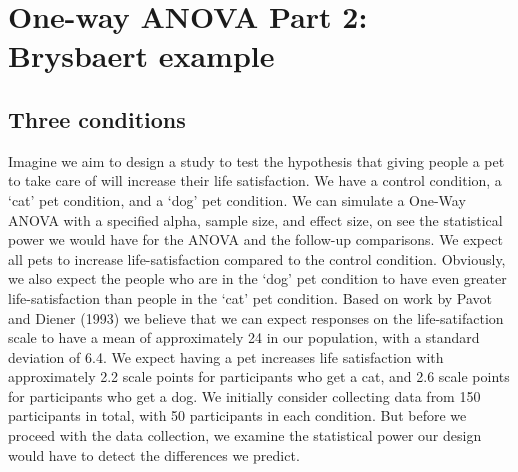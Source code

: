 \documentclass[]{book}
\begin{document}
\hypertarget{one-way-anova-part-2-brysbaert-example}{%
\section{One-way ANOVA Part 2: Brysbaert example}\label{one-way-anova-part-2-brysbaert-example}}

\hypertarget{three-conditions}{%
\subsection{Three conditions}\label{three-conditions}}

Imagine we aim to design a study to test the hypothesis that giving people a pet to take care of will increase their life satisfaction. We have a control condition, a `cat' pet condition, and a `dog' pet condition. We can simulate a One-Way ANOVA with a specified alpha, sample size, and effect size, on see the statistical power we would have for the ANOVA and the follow-up comparisons. We expect all pets to increase life-satisfaction compared to the control condition. Obviously, we also expect the people who are in the `dog' pet condition to have even greater life-satisfaction than people in the `cat' pet condition. Based on work by Pavot and Diener (1993) we believe that we can expect responses on the life-satifaction scale to have a mean of approximately 24 in our population, with a standard deviation of 6.4. We expect having a pet increases life satisfaction with approximately 2.2 scale points for participants who get a cat, and 2.6 scale points for participants who get a dog. We initially consider collecting data from 150 participants in total, with 50 participants in each condition. But before we proceed with the data collection, we examine the statistical power our design would have to detect the differences we predict.
\end{document}
